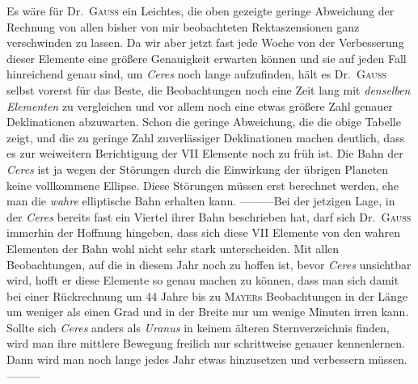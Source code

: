 Es wäre für Dr.\ \textsc{Gauss} ein Leichtes, die oben gezeigte geringe Abweichung der Rechnung von allen bisher von mir beobachteten Rektaszensionen ganz verschwinden zu lassen. Da wir aber jetzt fast jede Woche von der Verbesserung dieser Elemente eine größere Genauigkeit erwarten können und sie auf jeden Fall hinreichend genau sind, um \textit{Ceres} noch lange aufzufinden, hält es Dr.\ \textsc{Gauss} selbst vorerst für das Beste, die Beobachtungen noch eine Zeit lang mit \textit{denselben Elementen} zu vergleichen und vor allem noch eine etwas größere Zahl genauer Deklinationen abzuwarten. Schon die geringe Abweichung, die die obige Tabelle zeigt, und die zu geringe Zahl zuverlässiger Deklinationen machen deutlich, dass es zur weiweitern Berichtigung der VII Elemente noch zu früh ist. Die Bahn der \textit{Ceres} ist ja wegen der Störungen durch die Einwirkung der übrigen Planeten keine vollkommene Ellipse. Diese Störungen müssen erst berechnet werden, ehe man die \textit{wahre} elliptische Bahn erhalten kann. —\quad —\quad —\quad Bei der jetzigen Lage, in der \textit{Ceres} bereits fast ein Viertel ihrer Bahn beschrieben hat, darf sich Dr.\ \textsc{Gauss} immerhin der Hoffnung hingeben, dass sich diese VII Elemente von den wahren Elementen der Bahn wohl nicht sehr stark unterscheiden. Mit allen Beobachtungen, auf die in diesem Jahr noch zu hoffen ist, bevor \textit{Ceres} unsichtbar wird, hofft er diese Elemente so genau machen zu können, dass man sich damit bei einer Rückrechnung um 44 Jahre bis zu \textsc{Mayer}s Beobachtungen in der Länge um weniger als einen Grad und in der Breite nur um wenige Minuten irren kann. Sollte sich \textit{Ceres} anders als \textit{Uranus} in keinem älteren Sternverzeichnis finden, wird man ihre mittlere Bewegung freilich nur schrittweise genauer kennenlernen. Dann wird man noch lange jedes Jahr etwas hinzusetzen und verbessern müssen. —\quad —\quad —


